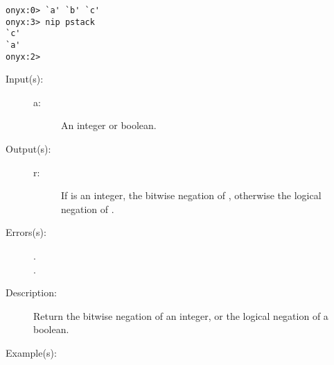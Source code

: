 \begin{description}
\begin{description}
\begin{verbatim}
onyx:0> `a' `b' `c'
onyx:3> nip pstack
`c'
`a'
onyx:2>
		\end{verbatim}
	\end{description}
\label{systemdict:not}
\item[{\onyxop{a}{not}{r}}: ]
	\begin{description}\item[]
	\item[Input(s): ]
		\begin{description}\item[]
		\item[a: ]
			An integer or boolean.
		\end{description}
	\item[Output(s): ]
		\begin{description}\item[]
		\item[r: ]
			If  is an integer, the bitwise negation of
			, otherwise the logical negation of .
		\end{description}
	\item[Errors(s): ]
		\begin{description}\item[]
		\item[.]
		\item[.]
		\end{description}
	\item[Description: ]
		Return the bitwise negation of an integer, or the logical
		negation of a boolean.
	\item[Example(s): ]\begin{verbatim}


\end{verbatim}
\end{description}
\end{description}
